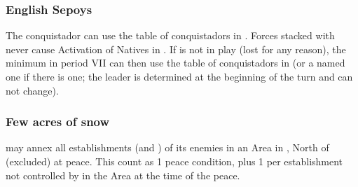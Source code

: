 \subsubsection{English Sepoys}

 The conquistador  can use
the table of conquistadors in . Forces stacked with
 never cause Activation of Natives in .
\bparag If  is not in play (lost for any reason), the
minimum \LeaderC in period VII can then use the table of conquistadors
in  (or a named one if there is one; the leader is
determined at the beginning of the turn and can not change).

\subsubsection{Few acres of snow}
\aparag \ANG may annex all establishments (\COL and \TP) of its enemies
in an Area in \continentAmerica, North of \granderegionChichimeca
(excluded) at peace.
\bparag This count as 1 peace condition, plus 1 per establishment not
controlled by \ANG in the Area at the time of the peace.

~\\

